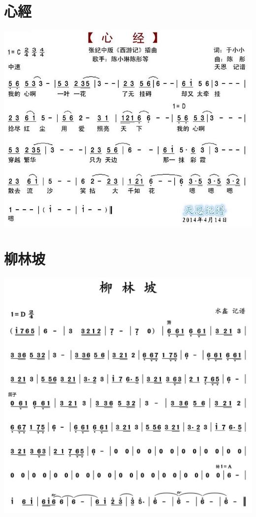 \documentclass[cn,pad,twocol]{elegantbook}
\begin{document}
\section{心經}
    \includegraphics[width=\textwidth]{dongxiao/20201231-心经} 
\section{柳林坡}
    \includegraphics[width=\textwidth]{dongxiao/20201231-柳林坡}
\end{document}
